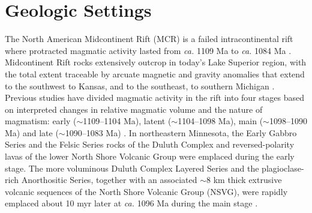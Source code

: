 \documentclass[draft]{agujournal2019}
\begin{document}
\section*{Geologic Settings}
The North American Midcontinent Rift (MCR) is a failed intracontinental rift where protracted magmatic activity lasted from \textit{ca.} 1109 Ma to \textit{ca.} 1084 Ma \cite{Swanson-Hysell2019a}. Midcontinent Rift rocks extensively outcrop in today's Lake Superior region, with the total extent traceable by arcuate magnetic and gravity anomalies that extend to the southwest to Kansas, and to the southeast, to southern Michigan \cite{Hinze2020a}. Previous studies have divided magmatic activity in the rift into four stages based on interpreted changes in relative magmatic volume and the nature of magmatism: early ($\sim$1109–1104 Ma), latent ($\sim$1104–1098 Ma), main ($\sim$1098–1090 Ma) and late ($\sim$1090–1083 Ma) \cite{Vervoort2007a, Heaman2007a, Miller2013a}. In northeastern Minnesota, the Early Gabbro Series and the Felsic Series rocks of the Duluth Complex and reversed-polarity lavas of the lower North Shore Volcanic Group were emplaced during the early stage. The more voluminous Duluth Complex Layered Series and the plagioclase-rich Anorthositic Series, together with an associated $\sim$8 km thick extrusive volcanic sequences of the North Shore Volcanic Group (NSVG), were rapidly emplaced about 10 myr later at \textit{ca.} 1096 Ma during the main stage \cite{Paces1993a, Swanson-Hysell2020a}. 
\end{document}
